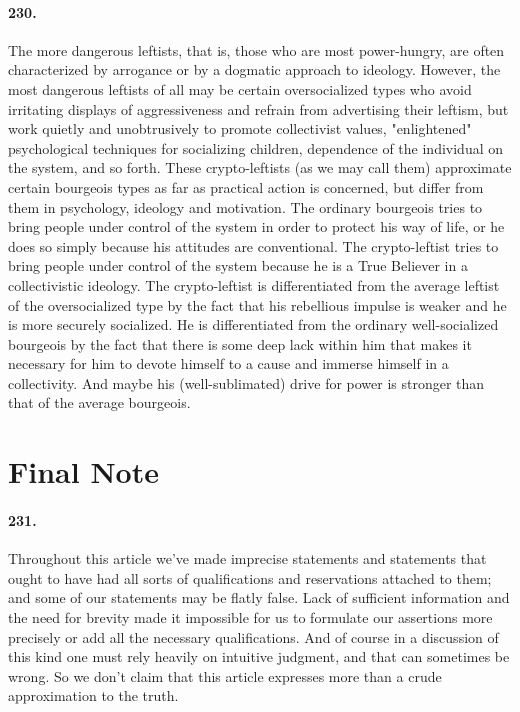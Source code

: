 \documentclass[12pt]{book}
\newcommand{\mysection}[1]{\section*{#1} \addcontentsline{toc}{section}{#1}}
\begin{document}
\paragraph{230.} The more dangerous leftists, that is, those who are most power-hungry, are often characterized by arrogance or by a dogmatic approach to ideology. However, the most dangerous leftists of all may be certain oversocialized types who avoid irritating displays of aggressiveness and refrain from advertising their leftism, but work quietly and unobtrusively to promote collectivist values, "enlightened" psychological techniques for socializing children, dependence of the individual on the system, and so forth. These crypto-leftists (as we may call them) approximate certain bourgeois types as far as practical action is concerned, but differ from them in psychology, ideology and motivation. The ordinary bourgeois tries to bring people under control of the system in order to protect his way of life, or he does so simply because his attitudes are conventional. The crypto-leftist tries to bring people under control of the system because he is a True Believer in a collectivistic ideology. The crypto-leftist is differentiated from the average leftist of the oversocialized type by the fact that his rebellious impulse is weaker and he is more securely socialized. He is differentiated from the ordinary well-socialized bourgeois by the fact that there is some deep lack within him that makes it necessary for him to devote himself to a cause and immerse himself in a collectivity. And maybe his (well-sublimated) drive for power is stronger than that of the average bourgeois.

\mysection{Final Note}


\paragraph{231.} Throughout this article we've made imprecise statements and statements that ought to have had all sorts of qualifications and reservations attached to them; and some of our statements may be flatly false. Lack of sufficient information and the need for brevity made it impossible for us to formulate our assertions more precisely or add all the necessary qualifications. And of course in a discussion of this kind one must rely heavily on intuitive judgment, and that can sometimes be wrong. So we don't claim that this article expresses more than a crude approximation to the truth.
\end{document}
